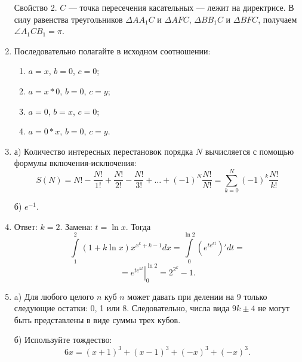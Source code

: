 \begin{enumerate}
Свойство 2. $C$ --- точка пересечения касательных --- лежит на директрисе. В силу равенства треугольников $\Delta AA_1C$ и $\Delta AFC$, $\Delta BB_1C$ и $\Delta BFC$, получаем $\angle A_1CB_1 = \pi$.

\item Последовательно полагайте в исходном соотношении:
\begin{enumerate}
\item $a = x$, $b = 0$, $c = 0$;
\item $a = x * 0$, $b = 0$, $c = y$;
\item $a = 0$, $b = x$, $c = 0$;
\item $a = 0 * x$, $b = 0$, $c = y$.
\end{enumerate}

\item а) Количество интересных перестановок порядка $N$ вычисляется с помощью формулы включения-исключения:
$$S(N) = N!-{\frac {N!}{1!}}+{\frac {N!}{2!}}-{\frac {N!}{3!}} + \dots +(-1)^{N}{\frac {N!}{N!}}=\sum _{k=0}^{N}(-1)^{k}{\frac {N!}{k!}}
$$

б) $e^{-1}$.

\item Ответ: $k = 2$. Замена: $t = \ln{x}$. Тогда
$$\int\limits_{1}^{2} \left( 1 + k \ln{x} \right) x^{x^k + k - 1} dx = \int\limits_{0}^{\ln{2}} \left(e^{te^{kt}} \right)' dt = $$
$$=\left. e^{te^{kt}} \right|_{0}^{\ln{2}} = 2^{2^k} - 1.$$

\item a) Для любого целого $n$ куб $n$ может давать при делении на 9 только следующие остатки: 0, 1 или 8. Следовательно, числа вида $9k \pm 4$ не могут быть представлены в виде суммы трех кубов.

б) Используйте тождество:
$$6x = (x+1)^3 + (x-1)^3 + (-x)^3 + (-x)^3.$$


\end{enumerate}
